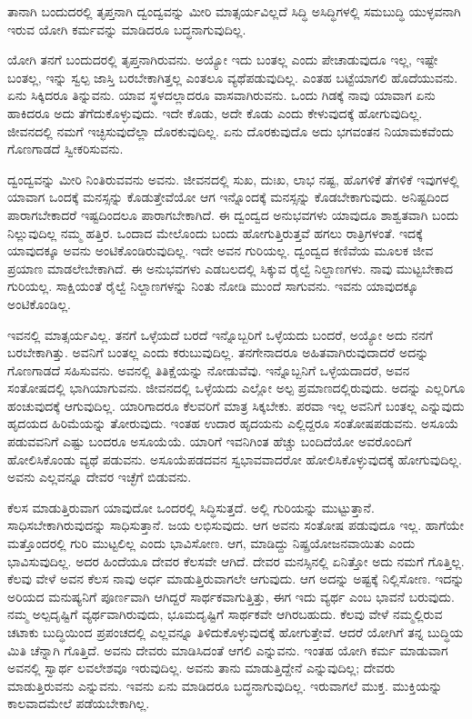 \begin{artha}
ತಾನಾಗಿ ಬಂದುದರಲ್ಲಿ ತೃಪ್ತನಾಗಿ ದ್ವಂದ್ವವನ್ನು ಮೀರಿ ಮಾತ್ಸರ್ಯವಿಲ್ಲದೆ ಸಿದ್ಧಿ ಅಸಿದ್ಧಿಗಳಲ್ಲಿ ಸಮಬುದ್ಧಿ ಯುಳ್ಳವನಾಗಿ ಇರುವ ಯೋಗಿ ಕರ್ಮವನ್ನು ಮಾಡಿದರೂ ಬದ್ಧನಾಗುವುದಿಲ್ಲ.
\end{artha}

ಯೋಗಿ ತನಗೆ ಬಂದುದರಲ್ಲಿ ತೃಪ್ತನಾಗಿರುವನು. ಅಯ್ಯೋ ಇದು ಬಂತಲ್ಲ ಎಂದು ಪೇಚಾಡುವುದೂ ಇಲ್ಲ, ಇಷ್ಟೇ ಬಂತಲ್ಲ, ಇನ್ನು ಸ್ವಲ್ಪ ಜಾಸ್ತಿ ಬರಬೇಕಾಗಿತ್ತಲ್ಲ ಎಂತಲೂ ವ್ಯಥೆಪಡುವುದಿಲ್ಲ. ಎಂತಹ ಬಟ್ಟೆಯಾಗಲಿ ಹೊದೆಯುವನು. ಏನು ಸಿಕ್ಕಿದರೂ ತಿನ್ನುವನು. ಯಾವ ಸ್ಥಳದಲ್ಲಾದರೂ ವಾಸವಾಗಿರುವನು. ಒಂದು ಗಿಡಕ್ಕೆ ನಾವು ಯಾವಾಗ ಏನು ಹಾಕಿದರೂ ಅದು ತೆಗೆದುಕೊಳ್ಳುವುದು. ಇದೇ ಕೊಡು, ಅದೇ ಕೊಡು ಎಂದು ಕೇಳುವುದಕ್ಕೆ ಹೋಗುವುದಿಲ್ಲ. ಜೀವನದಲ್ಲಿ ನಮಗೆ ಇಚ್ಛಿಸುವುದೆಲ್ಲಾ ದೊರಕುವುದಿಲ್ಲ. ಏನು ದೊರಕುವುದೊ ಅದು ಭಗವಂತನ ನಿಯಾಮಕವೆಂದು ಗೊಣಗಾಡದೆ ಸ್ವೀಕರಿಸುವನು.

ದ್ವಂದ್ವವನ್ನು ಮೀರಿ ನಿಂತಿರುವವನು ಅವನು. ಜೀವನದಲ್ಲಿ ಸುಖ, ದುಃಖ, ಲಾಭ ನಷ್ಟ, ಹೊಗಳಿಕೆ ತೆಗಳಿಕೆ ಇವುಗಳಲ್ಲಿ ಯಾವಾಗ ಒಂದಕ್ಕೆ ಮನಸ್ಸನ್ನು ಕೊಡುತ್ತೇವೆಯೋ ಆಗ ಇನ್ನೊಂದಕ್ಕೆ ಮನಸ್ಸನ್ನು ಕೊಡಬೇಕಾಗುವುದು. ಅನಿಷ್ಟದಿಂದ ಪಾರಾಗಬೇಕಾದರೆ ಇಷ್ಟದಿಂದಲೂ ಪಾರಾಗಬೇಕಾಗಿದೆ. ಈ ದ್ವಂದ್ವದ ಅನುಭವಗಳು ಯಾವುದೂ ಶಾಶ್ವತವಾಗಿ ಬಂದು ನಿಲ್ಲುವುದಿಲ್ಲ ನಮ್ಮ ಹತ್ತಿರ. ಒಂದಾದ ಮೇಲೊಂದು ಬಂದು ಹೋಗುತ್ತಿರುತ್ತವೆ ಹಗಲು ರಾತ್ರಿಗಳಂತೆ. ಇದಕ್ಕೆ ಯಾವುದಕ್ಕೂ ಅವನು ಅಂಟಿಕೊಂಡಿರುವುದಿಲ್ಲ. ಇದೇ ಅವನ ಗುರಿಯಲ್ಲ. ದ್ವಂದ್ವದ ಕಣಿವೆಯ ಮೂಲಕ ಜೀವ ಪ್ರಯಾಣ ಮಾಡಲೇಬೇಕಾಗಿದೆ. ಈ ಅನುಭವಗಳು ಎಡಬಲದಲ್ಲಿ ಸಿಕ್ಕುವ ರೈಲ್ವೆ ನಿಲ್ದಾಣಗಳು. ನಾವು ಮುಟ್ಟಬೇಕಾದ ಗುರಿಯಲ್ಲ. ಸಾಕ್ಷಿಯಂತೆ ರೈಲ್ವೆ ನಿಲ್ದಾಣಗಳನ್ನು ನಿಂತು ನೋಡಿ ಮುಂದೆ ಸಾಗುವನು. ಇವನು ಯಾವುದಕ್ಕೂ ಅಂಟಿಕೊಂಡಿಲ್ಲ.

ಇವನಲ್ಲಿ ಮಾತ್ಸರ್ಯವಿಲ್ಲ. ತನಗೆ ಒಳ್ಳೆಯದೆ ಬರದೆ ಇನ್ನೊಬ್ಬರಿಗೆ ಒಳ್ಳೆಯದು ಬಂದರೆ, ಅಯ್ಯೋ ಅದು ನನಗೆ ಬರಬೇಕಾಗಿತ್ತು. ಅವನಿಗೆ ಬಂತಲ್ಲ ಎಂದು ಕರುಬುವುದಿಲ್ಲ. ತನಗೇನಾ\-ದರೂ ಅಹಿತವಾಗಿರುವುದಾದರೆ ಅದನ್ನು ಗೊಣಗಾಡದೆ ಸಹಿಸುವನು. ಅವನಲ್ಲಿ ತಿತಿಕ್ಷೆಯನ್ನು ನೋಡುವೆವು. ಇನ್ನೊಬ್ಬನಿಗೆ ಒಳ್ಳೆಯದಾದರೆ, ಅವನ ಸಂತೋಷದಲ್ಲಿ ಭಾಗಿಯಾಗುವನು. ಜೀವನದಲ್ಲಿ ಒಳ್ಳೆಯದು ಎಲ್ಲೋ ಅಲ್ಪ ಪ್ರಮಾಣದಲ್ಲಿರುವುದು. ಅದನ್ನು ಎಲ್ಲರಿಗೂ ಹಂಚುವುದಕ್ಕೆ ಆಗುವುದಿಲ್ಲ. ಯಾರಿಗಾದರೂ ಕೆಲವರಿಗೆ ಮಾತ್ರ ಸಿಕ್ಕಬೇಕು. ಪರವಾ ಇಲ್ಲ ಅವನಿಗೆ ಬಂತಲ್ಲ ಎನ್ನುವುದು ಹೃದಯದ ಹಿರಿಮೆಯನ್ನು ತೋರುವುದು. ಇಂತಹ ಉದಾರ ಹೃದಯನು ಎಲ್ಲಿದ್ದರೂ ಸಂತೋಷಪಡುವನು. ಅಸೂಯೆ ಪಡುವವನಿಗೆ ಎಷ್ಟು ಬಂದರೂ ಅಸೂಯೆಯೆ. ಯಾರಿಗೆ ಇವನಿಗಿಂತ ಹೆಚ್ಚು ಬಂದಿದೆಯೋ ಅವರೊಂದಿಗೆ ಹೋಲಿಸಿಕೊಂಡು ವ್ಯಥೆ ಪಡುವನು. ಅಸೂಯೆಪಡದವನ ಸ್ವಭಾವವಾದರೋ ಹೋಲಿಸಿಕೊಳ್ಳುವುದಕ್ಕೆ ಹೋಗುವುದಿಲ್ಲ. ಅವನು ಎಲ್ಲವನ್ನೂ ದೇವರ ಇಚ್ಛೆಗೆ ಬಿಡುವನು.

ಕೆಲಸ ಮಾಡುತ್ತಿರುವಾಗ ಯಾವುದೋ ಒಂದರಲ್ಲಿ ಸಿದ್ಧಿಸುತ್ತದೆ. ಅಲ್ಲಿ ಗುರಿಯನ್ನು ಮುಟ್ಟುತ್ತಾನೆ. ಸಾಧಿಸಬೇಕಾಗಿರುವುದನ್ನು ಸಾಧಿಸುತ್ತಾನೆ. ಜಯ ಲಭಿಸುವುದು. ಆಗ ಅವನು ಸಂತೋಷ ಪಡುವುದೂ ಇಲ್ಲ. ಹಾಗೆಯೇ ಮತ್ತೊಂದರಲ್ಲಿ ಗುರಿ ಮುಟ್ಟಲಿಲ್ಲ ಎಂದು ಭಾವಿಸೋಣ. ಆಗ, ಮಾಡಿದ್ದು ನಿಷ್ಪ್ರಯೋಜನವಾಯಿತು ಎಂದು ಭಾವಿಸುವುದಿಲ್ಲ. ಅದರ ಹಿಂದೆಯೂ ದೇವರ ಕೆಲಸವೇ ಆಗಿದೆ. ದೇವರ ಮನಸ್ಸಿನಲ್ಲಿ ಏನಿತ್ತೋ ಅದು ನಮಗೆ ಗೊತ್ತಿಲ್ಲ. ಕೆಲವು ವೇಳೆ ಅವನ ಕೆಲಸ ನಾವು ಅರ್ಧ ಮಾಡುತ್ತಿರುವಾಗಲೇ ಆಗುವುದು. ಆಗ ಅದನ್ನು ಅಷ್ಟಕ್ಕೆ ನಿಲ್ಲಿಸೋಣ. ಇದನ್ನು ಅರಿಯದ ಮನುಷ್ಯನಿಗೆ ಪೂರ್ಣವಾಗಿ ಆಗಿದ್ದರೆ ಸಾರ್ಥಕವಾಗುತ್ತಿತ್ತು, ಈಗ ಇದು ವ್ಯರ್ಥ ಎಂಬ ಭಾವನೆ ಬರುವುದು. ನಮ್ಮ ಅಲ್ಪದೃಷ್ಟಿಗೆ ವ್ಯರ್ಥವಾಗಿರುವುದು, ಭೂಮದೃಷ್ಟಿಗೆ ಸಾರ್ಥಕವೇ ಆಗಿರಬಹುದು. ಕೆಲವು ವೇಳೆ ನಮ್ಮಲ್ಲಿರುವ ಚಟಾಕು ಬುದ್ಧಿಯಿಂದ ಪ್ರಪಂಚದಲ್ಲಿ ಎಲ್ಲವನ್ನೂ ತಿಳಿದುಕೊಳ್ಳುವುದಕ್ಕೆ ಹೋಗುತ್ತೇವೆ. ಆದರೆ ಯೋಗಿಗೆ ತನ್ನ ಬುದ್ಧಿಯ ಮಿತಿ ಚೆನ್ನಾಗಿ ಗೊತ್ತಿದೆ. ಅವನು ದೇವರು ಮಾಡಿಸಿದಂತೆ ಆಗಲಿ ಎನ್ನುವನು. ಇಂತಹ ಯೋಗಿ ಕರ್ಮ ಮಾಡುವಾಗ ಅವನಲ್ಲಿ ಸ್ವಾರ್ಥ ಲವಲೇಶವೂ ಇರುವುದಿಲ್ಲ. ಅವನು ತಾನು ಮಾಡುತ್ತಿದ್ದೇನೆ ಎನ್ನುವುದಿಲ್ಲ; ದೇವರು ಮಾಡುತ್ತಿರುವನು ಎನ್ನುವನು. ಇವನು ಏನು ಮಾಡಿದರೂ ಬದ್ಧನಾಗುವುದಿಲ್ಲ. ಇರುವಾಗಲೆ ಮುಕ್ತ. ಮುಕ್ತಿಯನ್ನು ಕಾಲವಾದಮೇಲೆ ಪಡೆಯಬೇಕಾಗಿಲ್ಲ.

